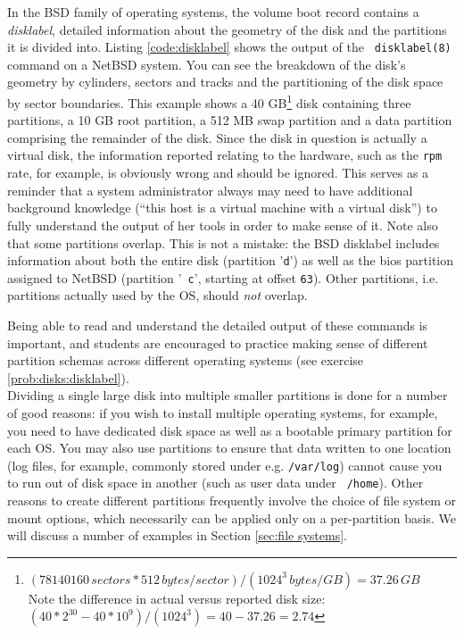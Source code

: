 In the BSD family of operating systems, the volume
boot record contains a {\em disklabel}, detailed
information about the geometry of the disk and the
partitions it is divided into.  Listing
\ref{code:disklabel} shows the output of the {\tt
disklabel(8)} command on a
NetBSD system.  You can see the
breakdown of the disk's geometry by cylinders, sectors
and tracks and the partitioning of the disk space by
sector boundaries.  This example shows a 40
GB\footnote{$ (78140160\, sectors * 512\, bytes/sector) /
(1024^3\, bytes/GB) = 37.26\, GB$ \\ Note the difference
in actual versus reported disk size: \\ $(40*2^{30} -
40*10^9)/(1024^3) = 40 - 37.26 = 2.74$ } disk
containing three partitions, a 10 GB root partition, a
512 MB swap partition and a data partition comprising
the remainder of the disk.  Since the disk in question
is actually a virtual disk, the information reported
relating to the hardware, such as the {\tt rpm} rate,
for example, is obviously wrong and should be ignored.
This serves as a reminder that a system
administrator always may need to have additional
background knowledge (``this host is a virtual machine
with a virtual disk'') to fully understand the output
of her tools in order to make sense of it.  Note also
that some partitions overlap.  This is not a mistake:
the BSD disklabel includes information about both the
entire disk (partition '{\tt d}') as well as the
\gls{bios} partition assigned to NetBSD (partition '{\tt
c}', starting at offset {\tt 63}).  Other partitions,
i.e.  partitions actually used by the OS, should {\em
not} overlap.

Being able to read and understand the detailed output
of these commands is important, and students are
encouraged to practice making sense of different
partition schemas across different operating systems
(see exercise \ref{prob:disks:disklabel}). \\

Dividing a single large disk into multiple smaller
partitions is done for a number of good reasons: if
you wish to install multiple operating systems, for
example, you need to have dedicated disk space as well
as a bootable primary partition for each OS.  You may
also use partitions to ensure that data written to one
location (log files, for example, commonly stored
under e.g. {\tt /var/log}) cannot cause you to run out
of disk space in another (such as user data under {\tt
/home}).  Other reasons to create different partitions
frequently involve the choice of file system or mount
options, which necessarily can be applied only on a
per-partition basis.  We will discuss a number of
examples in Section \ref{sec:file systems}.

